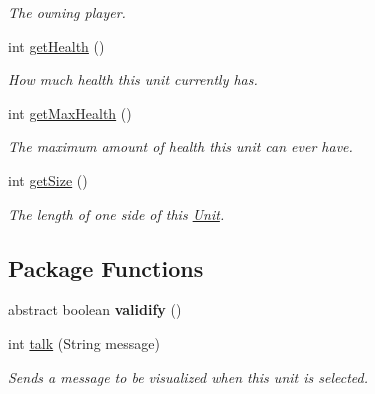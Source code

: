\begin{DoxyCompactItemize}
\begin{DoxyCompactList}\small\item\em The owning player. \item\end{DoxyCompactList}\item 
\hypertarget{classUnit_a610a98a68a3e99227b15af4161f26b70}{
int \hyperlink{classUnit_a610a98a68a3e99227b15af4161f26b70}{getHealth} ()}
\label{classUnit_a610a98a68a3e99227b15af4161f26b70}

\begin{DoxyCompactList}\small\item\em How much health this unit currently has. \item\end{DoxyCompactList}\item 
\hypertarget{classUnit_a10fd0c76ed34ca1b1363578c9add5224}{
int \hyperlink{classUnit_a10fd0c76ed34ca1b1363578c9add5224}{getMaxHealth} ()}
\label{classUnit_a10fd0c76ed34ca1b1363578c9add5224}

\begin{DoxyCompactList}\small\item\em The maximum amount of health this unit can ever have. \item\end{DoxyCompactList}\item 
\hypertarget{classUnit_a63fe82ecf12df209d0d7ee2e97b62a7e}{
int \hyperlink{classUnit_a63fe82ecf12df209d0d7ee2e97b62a7e}{getSize} ()}
\label{classUnit_a63fe82ecf12df209d0d7ee2e97b62a7e}

\begin{DoxyCompactList}\small\item\em The length of one side of this \hyperlink{classUnit}{Unit}. \item\end{DoxyCompactList}\end{DoxyCompactItemize}
\subsection*{Package Functions}
\begin{DoxyCompactItemize}
\item 
\hypertarget{classUnit_a8e78ca35d8648d664efc5052ab90428f}{
abstract boolean {\bfseries validify} ()}
\label{classUnit_a8e78ca35d8648d664efc5052ab90428f}

\item 
\hypertarget{classUnit_ae557e3feda4652355b4eee051169dea8}{
int \hyperlink{classUnit_ae557e3feda4652355b4eee051169dea8}{talk} (String message)}
\label{classUnit_ae557e3feda4652355b4eee051169dea8}

\begin{DoxyCompactList}\small\item\em Sends a message to be visualized when this unit is selected. \item\end{DoxyCompactList}\end{DoxyCompactItemize}
